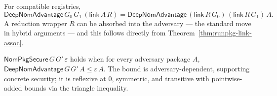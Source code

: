 \begin{theorem}
  \label{thm:deepnomadv-link}
  \leanok
  For compatible registries,
  \[
    \mathsf{DeepNomAdvantage}\,G_0\,G_1\,(\mathsf{link}\,A\,R) =
    \mathsf{DeepNomAdvantage}\,(\mathsf{link}\,R\,G_0)\,(\mathsf{link}\,R\,G_1)\,A.
  \]
  A reduction wrapper $R$ can be absorbed into the adversary — the standard move
  in hybrid arguments — and this follows directly from
  Theorem~\ref{thm:runpkg-link-assoc}.
\end{theorem}

\begin{definition}
  \label{def:nompkgsecure}
  \leanok
  $\mathsf{NomPkgSecure}\,G\,G'\,\varepsilon$ holds when for every adversary
  package $A$, $\mathsf{DeepNomAdvantage}\,G\,G'\,A \le \varepsilon\,A$. The
  bound is adversary-dependent, supporting concrete security; it is reflexive
  at $0$, symmetric, and transitive with pointwise-added bounds via the triangle
  inequality.
\end{definition}
